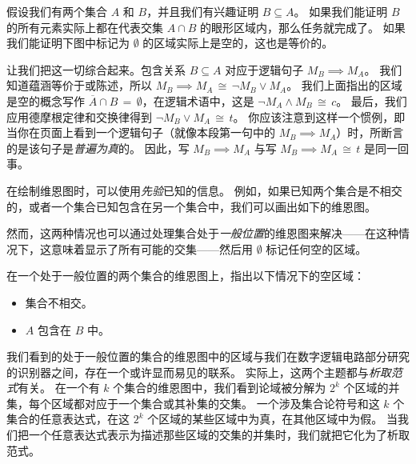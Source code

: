 假设我们有两个集合 $A$ 和 $B$，并且我们有兴趣证明 $B \subseteq A$。
如果我们能证明 $B$ 的所有元素实际上都在代表交集 $A \cap B$ 的眼形区域内，那么任务就完成了。
如果我们能证明下图中标记为 $\emptyset$ 的区域实际上是空的，这也是等价的。
\vspace{.1in}



\vspace{.1in}

让我们把这一切综合起来。包含关系 $B \subseteq A$ 对应于逻辑句子 $M_B \implies M_A$。
我们知道蕴涵等价于或陈述，所以 $M_B \implies M_A \, \cong \, {\lnot}M_B \lor M_A$。
我们上面指出的区域是空的概念写作 $\overline{A} \cap B \, = \, \emptyset$，在逻辑术语中，这是 ${\lnot}M_A \land M_B \, \cong \, c$。
最后，我们应用德摩根定律和交换律得到 ${\lnot}M_B \lor M_A \, \cong \, t$。
你应该注意到这样一个惯例，即当你在页面上看到一个逻辑句子（就像本段第一句中的 $M_B \implies M_A$）时，所断言的是该句子是\emph{普遍为真}的。
因此，写 $M_B \implies M_A$ 与写 $M_B \implies M_A \, \cong \, t$ 是同一回事。

在绘制维恩图时，可以使用\emph{先验}已知的信息。
例如，如果已知两个集合是不相交的，或者一个集合已知包含在另一个集合中，我们可以画出如下的维恩图。
\vspace{.1in}



\vspace{.2in}



\vspace{.1in}

然而，这两种情况也可以通过处理集合处于\emph{一般位置}的维恩图来解决——在这种情况下，这意味着显示了所有可能的交集——然后用 $\emptyset$ 标记任何空的区域。
\begin{exer}
在一个处于一般位置的两个集合的维恩图上，指出以下情况下的空区域：
\begin{itemize}
\item[a)] 集合不相交。
\item[b)] $A$ 包含在 $B$ 中。
\end{itemize}


\end{exer}

我们看到的处于一般位置的集合的维恩图中的区域与我们在数字逻辑电路部分研究的识别器之间，存在一个或许显而易见的联系。
实际上，这两个主题都与\emph{析取范式}有关。
在一个有 $k$ 个集合的维恩图中，我们看到论域被分解为 $2^k$ 个区域的并集，每个区域都对应于一个集合或其补集的交集。
一个涉及集合论符号和这 $k$ 个集合的任意表达式，在这 $2^k$ 个区域的某些区域中为真，在其他区域中为假。
当我们把一个任意表达式表示为描述那些区域的交集的并集时，我们就把它化为了析取范式。
\vspace{.1in}

